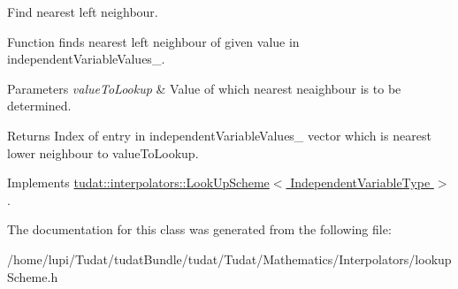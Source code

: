 Find nearest left neighbour. 

Function finds nearest left neighbour of given value in independent\+Variable\+Values\+\_\+. 
\begin{DoxyParams}{Parameters}
{\em value\+To\+Lookup} & Value of which nearest neaighbour is to be determined. \\
\hline
\end{DoxyParams}
\begin{DoxyReturn}{Returns}
Index of entry in independent\+Variable\+Values\+\_\+ vector which is nearest lower neighbour to value\+To\+Lookup. 
\end{DoxyReturn}


Implements \hyperlink{classtudat_1_1interpolators_1_1LookUpScheme_a7749ee1bb2df25690a6e040a3e61f646}{tudat\+::interpolators\+::\+Look\+Up\+Scheme$<$ Independent\+Variable\+Type $>$}.



The documentation for this class was generated from the following file\+:\begin{DoxyCompactItemize}
\item 
/home/lupi/\+Tudat/tudat\+Bundle/tudat/\+Tudat/\+Mathematics/\+Interpolators/lookup\+Scheme.\+h\end{DoxyCompactItemize}
